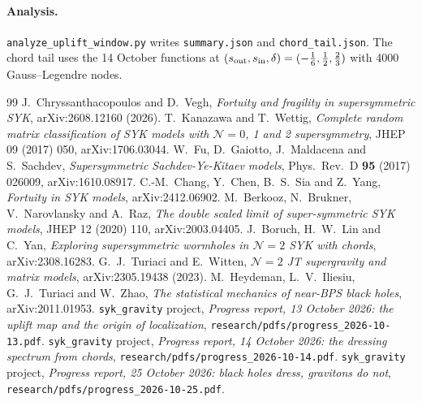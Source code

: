 \documentclass[11pt]{article}
\theoremstyle{plain}
\theoremstyle{remark}
\numberwithin{equation}{section}
\begin{document}
\paragraph{Analysis.} \texttt{analyze\_uplift\_window.py} writes \texttt{summary.json} and \texttt{chord\_tail.json}.
The chord tail uses the 14 October functions at $(s_{\rm out},s_{\rm in},\delta)=(-\tfrac16,\tfrac12,\tfrac23)$ with
4000 Gauss--Legendre nodes.

\begin{thebibliography}{99}\small
{} J.~Chryssanthacopoulos and D.~Vegh, \emph{Fortuity and fragility in supersymmetric SYK}, arXiv:2608.12160 (2026).
 T.~Kanazawa and T.~Wettig, \emph{Complete random matrix classification of SYK models with $\mathcal N=0$, 1 and 2 supersymmetry}, JHEP 09 (2017) 050, arXiv:1706.03044.
 W.~Fu, D.~Gaiotto, J.~Maldacena and S.~Sachdev, \emph{Supersymmetric Sachdev-Ye-Kitaev models}, Phys.\ Rev.\ D \textbf{95} (2017) 026009, arXiv:1610.08917.
 C.-M.~Chang, Y.~Chen, B.~S.~Sia and Z.~Yang, \emph{Fortuity in SYK models}, arXiv:2412.06902.
 M.~Berkooz, N.~Brukner, V.~Narovlansky and A.~Raz, \emph{The double scaled limit of super-symmetric SYK models}, JHEP 12 (2020) 110, arXiv:2003.04405.
 J.~Boruch, H.~W.~Lin and C.~Yan, \emph{Exploring supersymmetric wormholes in $\mathcal N=2$ SYK with chords}, arXiv:2308.16283.
 G.~J.~Turiaci and E.~Witten, \emph{$\mathcal N=2$ JT supergravity and matrix models}, arXiv:2305.19438 (2023).
 M.~Heydeman, L.~V.~Iliesiu, G.~J.~Turiaci and W.~Zhao, \emph{The statistical mechanics of near-BPS black holes}, arXiv:2011.01953.
 \texttt{syk\_gravity} project, \emph{Progress report, 13 October 2026: the uplift map and the origin of localization}, \texttt{research/pdfs/progress\_2026-10-13.pdf}.
 \texttt{syk\_gravity} project, \emph{Progress report, 14 October 2026: the dressing spectrum from chords}, \texttt{research/pdfs/progress\_2026-10-14.pdf}.
 \texttt{syk\_gravity} project, \emph{Progress report, 25 October 2026: black holes dress, gravitons do not}, \texttt{research/pdfs/progress\_2026-10-25.pdf}.
\end{thebibliography}
\end{document}
